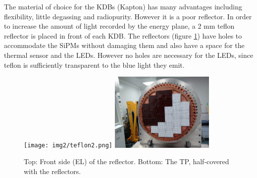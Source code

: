 The material of choice for the KDBs (Kapton) has many advantages including flexibility, little degassing and radiopurity. However it is a poor reflector. In order to increase the amount of light recorded by the energy plane, a 2 mm teflon reflector is placed in front of each KDB. The reflectors (figure \ref{fig:reflector}) have holes to accommodate the SiPMs without damaging them and also have a space for the thermal sensor and the LEDs. However no holes are necessary for the LEDs, since teflon is sufficiently transparent to the blue light they emit. 
\begin{figure}[hpt!]
\centering
\texttt{[image: img2/teflon2.png]}
\includegraphics[width=0.45\textwidth]{img2/HalfAndHalf.png}

\caption{Top: Front side (EL) of the reflector. Bottom: The TP, half-covered with the reflectors.}
\label{fig:reflector}
\end{figure}

